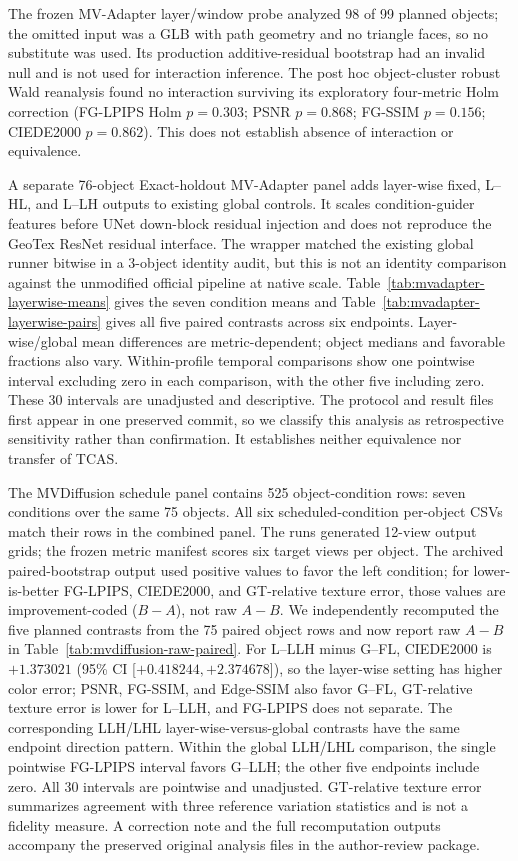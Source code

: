 \documentclass[11pt]{article}
\begin{document}
The frozen MV-Adapter layer/window probe analyzed 98 of 99 planned objects; the omitted input was a GLB with path geometry and no triangle faces, so no substitute was used. Its production additive-residual bootstrap had an invalid null and is not used for interaction inference. The post hoc object-cluster robust Wald reanalysis found no interaction surviving its exploratory four-metric Holm correction (FG-LPIPS Holm $p=0.303$; PSNR $p=0.868$; FG-SSIM $p=0.156$; CIEDE2000 $p=0.862$). This does not establish absence of interaction or equivalence.

A separate 76-object Exact-holdout MV-Adapter panel adds layer-wise fixed, L--HL, and L--LH outputs to existing global controls. It scales condition-guider features before UNet down-block residual injection and does not reproduce the GeoTex ResNet residual interface. The wrapper matched the existing global runner bitwise in a 3-object identity audit, but this is not an identity comparison against the unmodified official pipeline at native scale. Table~\ref{tab:mvadapter-layerwise-means} gives the seven condition means and Table~\ref{tab:mvadapter-layerwise-pairs} gives all five paired contrasts across six endpoints. Layer-wise/global mean differences are metric-dependent; object medians and favorable fractions also vary. Within-profile temporal comparisons show one pointwise interval excluding zero in each comparison, with the other five including zero. These 30 intervals are unadjusted and descriptive. The protocol and result files first appear in one preserved commit, so we classify this analysis as retrospective sensitivity rather than confirmation. It establishes neither equivalence nor transfer of TCAS.

The MVDiffusion schedule panel contains 525 object-condition rows: seven conditions over the same 75 objects. All six scheduled-condition per-object CSVs match their rows in the combined panel. The runs generated 12-view output grids; the frozen metric manifest scores six target views per object. The archived paired-bootstrap output used positive values to favor the left condition; for lower-is-better FG-LPIPS, CIEDE2000, and GT-relative texture error, those values are improvement-coded ($B-A$), not raw $A-B$. We independently recomputed the five planned contrasts from the 75 paired object rows and now report raw $A-B$ in Table~\ref{tab:mvdiffusion-raw-paired}. For L--LLH minus G--FL, CIEDE2000 is $+1.373021$ (95\% CI [$+0.418244,+2.374678$]), so the layer-wise setting has higher color error; PSNR, FG-SSIM, and Edge-SSIM also favor G--FL, GT-relative texture error is lower for L--LLH, and FG-LPIPS does not separate. The corresponding LLH/LHL layer-wise-versus-global contrasts have the same endpoint direction pattern. Within the global LLH/LHL comparison, the single pointwise FG-LPIPS interval favors G--LLH; the other five endpoints include zero. All 30 intervals are pointwise and unadjusted. GT-relative texture error summarizes agreement with three reference variation statistics and is not a fidelity measure. A correction note and the full recomputation outputs accompany the preserved original analysis files in the author-review package.
\end{document}
